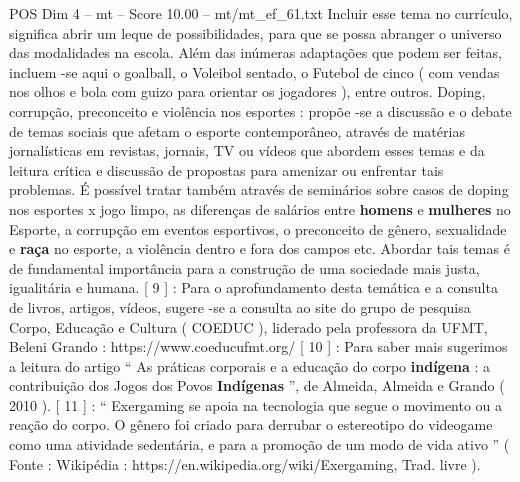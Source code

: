 \begin{textsample}{POS Dim 4 – mt – Score 10.00 – mt/mt\_ef\_61.txt}
Incluir esse tema no currículo, significa abrir um leque de possibilidades, para que se possa abranger o universo das modalidades na escola.
Além das inúmeras adaptações que podem ser feitas, incluem -se aqui o goalball, o Voleibol sentado, o Futebol de cinco ( com vendas nos olhos e bola com guizo para orientar os jogadores ), entre outros.
Doping, corrupção, preconceito e violência nos esportes : propõe -se a discussão e o debate de temas sociais que afetam o esporte contemporâneo, através de matérias jornalísticas em revistas, jornais, TV ou vídeos que abordem esses temas e da leitura crítica e discussão de propostas para amenizar ou enfrentar tais problemas.
É possível tratar também através de seminários sobre casos de doping nos esportes x jogo limpo, as diferenças de salários entre \textbf{homens} e \textbf{mulheres} no Esporte, a corrupção em eventos esportivos, o preconceito de gênero, sexualidade e \textbf{raça} no esporte, a violência dentro e fora dos campos etc.
Abordar tais temas é de fundamental importância para a construção de uma sociedade mais justa, igualitária e humana. [ 9 ] : Para o aprofundamento desta temática e a consulta de livros, artigos, vídeos, sugere -se a consulta ao site do grupo de pesquisa Corpo, Educação e Cultura ( COEDUC ), liderado pela professora da UFMT, Beleni Grando : https://www.coeducufmt.org/ [ 10 ] : Para saber mais sugerimos a leitura do artigo “ As práticas corporais e a educação do corpo \textbf{indígena} : a contribuição dos Jogos dos Povos \textbf{Indígenas} ”, de Almeida, Almeida e Grando ( 2010 ). [ 11 ] : “ Exergaming se apoia na tecnologia que segue o movimento ou a reação do corpo.
O gênero foi criado para derrubar o estereotipo do videogame como uma atividade sedentária, e para a promoção de um modo de vida ativo ” ( Fonte : Wikipédia : https://en.wikipedia.org/wiki/Exergaming, Trad. livre ).

\end{textsample}
